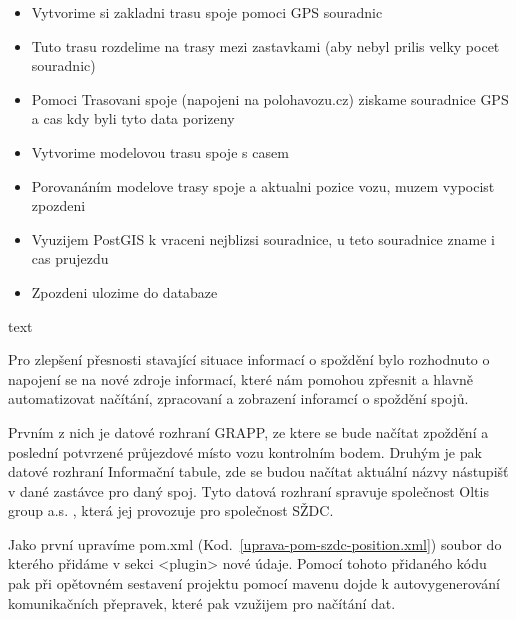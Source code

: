 \begin{itemize}
	\item Vytvorime si zakladni trasu spoje pomoci GPS souradnic
	\item Tuto trasu rozdelime na trasy mezi zastavkami (aby nebyl prilis velky pocet souradnic)
	\item Pomoci Trasovani spoje (napojeni na polohavozu.cz) ziskame souradnice GPS a cas kdy byli tyto data porizeny
	\item Vytvorime modelovou trasu spoje s casem
	\item Porovanáním modelove trasy spoje a aktualni pozice vozu, muzem vypocist zpozdeni
	\item Vyuzijem PostGIS k vraceni nejblizsi souradnice, u teto souradnice zname i cas prujezdu
	\item Zpozdeni ulozime do databaze
\end{itemize}

text


Pro zlepšení přesnosti stavající situace informací o spoždění bylo rozhodnuto o napojení se na nové zdroje informací, které nám pomohou zpřesnit a hlavně automatizovat načítání, zpracovaní a zobrazení inforamcí o spoždění spojů.

 Prvním z nich je datové rozhraní GRAPP, ze ktere se bude načítat zpoždění a poslední potvrzené průjezdové místo vozu kontrolním bodem. Druhým je pak datové rozhraní Informační tabule, zde se budou načítat aktuální názvy nástupišť v dané zastávce pro daný spoj. Tyto datová rozhraní spravuje společnost Oltis group a.s. , která jej provozuje pro společnost SŽDC.
 
 Jako první upravíme pom.xml (Kod.~\ref{uprava-pom-szdc-position.xml}) soubor do kterého přidáme v sekci <plugin> nové údaje. Pomocí tohoto přidaného kódu pak při opětovném sestavení projektu pomocí mavenu dojde k autovygenerování komunikačních přepravek, které pak vzužijem pro načítání dat.
 
 
